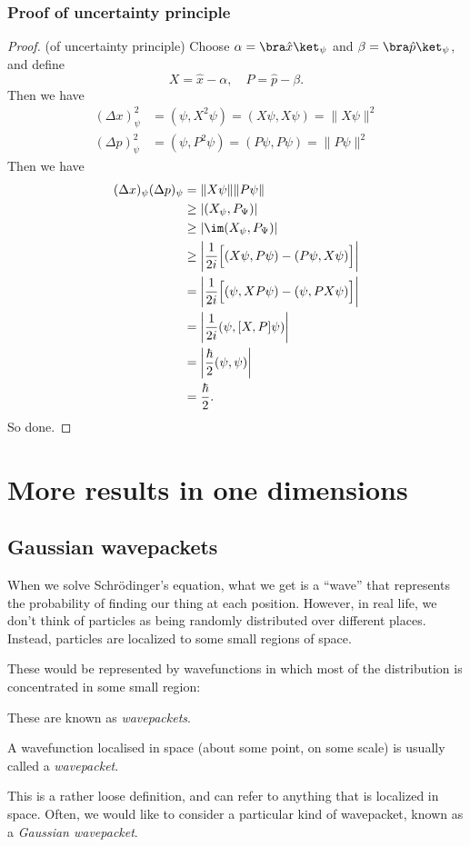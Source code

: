 \documentclass[a4paper]{article}
\begin{document}
\subsubsection*{Proof of uncertainty principle}
\begin{proof}(of uncertainty principle)
  Choose $\alpha = \bra \hat{x}\ket _\psi$ and $\beta = \bra \hat{p}\ket_\psi$, and define
  \[
    X = \hat{x} - \alpha,\quad P = \hat{p} - \beta.
  \]
  Then we have
  \begin{align*}
    (\Delta x)_\psi^2 &= (\psi, X^2 \psi) = (X\psi, X\psi) = \|X\psi\|^2\\
    (\Delta p)_\psi^2 &= (\psi, P^2 \psi) = (P\psi, P\psi) = \|P\psi\|^2
  \end{align*}
  Then we have
  \begin{align*}
    (\Delta x)_\psi (\Delta p)_\psi &= \|X\psi\|\|P\psi\|\\
    &\geq |(X_\psi, P_\Psi)|\\
    &\geq |\im(X_\psi, P_\Psi)|\\
    &\geq \left|\frac{1}{2i}\Big[(X\psi, P\psi) - (P\psi, X\psi)\Big]\right|\\
    &= \left|\frac{1}{2i}\Big[(\psi, XP\psi) - (\psi, PX\psi)\Big]\right|\\
    &= \left|\frac{1}{2i}(\psi, [X, P]\psi)\right|\\
    &= \left|\frac{\hbar}{2}(\psi, \psi)\right|\\
    &= \frac{\hbar}{2}.
  \end{align*}
  So done.
\end{proof}
\section{More results in one dimensions}
\subsection{Gaussian wavepackets}
When we solve Schr\"odinger's equation, what we get is a ``wave'' that represents the probability of finding our thing at each position. However, in real life, we don't think of particles as being randomly distributed over different places. Instead, particles are localized to some small regions of space.

These would be represented by wavefunctions in which most of the distribution is concentrated in some small region:
\begin{center}
\end{center}
These are known as \emph{wavepackets}.
\begin{defi}[Wavepacket]
  A wavefunction localised in space (about some point, on some scale) is usually called a \emph{wavepacket}.
\end{defi}
This is a rather loose definition, and can refer to anything that is localized in space. Often, we would like to consider a particular kind of wavepacket, known as a \emph{Gaussian wavepacket}.
\end{document}
